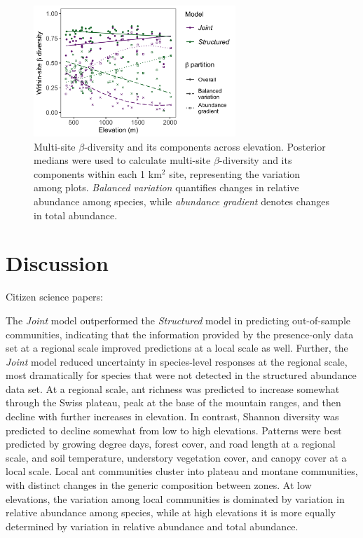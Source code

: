 \documentclass[preprint,review,times,12pt,3p]{elsarticle}
\begin{document}
\begin{figure}
\centering\includegraphics[width=3in]{../../../ms/1_Ecography/1/figs/beta_diversity.png}
\caption{\label{fig:beta_div} Multi-site $\beta$-diversity and its components across elevation. Posterior medians were used to calculate multi-site $\beta$-diversity and its components within each 1 km$^2$ site, representing the variation among plots. \emph{Balanced variation} quantifies changes in relative abundance among species, while \emph{abundance gradient} denotes changes in total abundance.}
\end{figure}


 




\section{Discussion}
\label{S:4}
Citizen science papers: \citep{Altwegg2019, Pernat2020, Henckel2020, Duan2020, Johnston2020,Robinson2020, Beck2010, Poisson2020}

The \emph{Joint} model outperformed the \emph{Structured} model in predicting out-of-sample communities, indicating that the information provided by the presence-only data set at a regional scale improved predictions at a local scale as well. Further, the \emph{Joint} model reduced uncertainty in species-level responses at the regional scale, most dramatically for species that were not detected in the structured abundance data set. At a regional scale, ant richness was predicted to increase somewhat through the Swiss plateau, peak at the base of the mountain ranges, and then decline with further increases in elevation. In contrast, Shannon diversity was predicted to decline somewhat from low to high elevations. Patterns were best predicted by growing degree days, forest cover, and road length at a regional scale, and soil temperature, understory vegetation cover, and canopy cover at a local scale. Local ant communities cluster into plateau and montane communities, with distinct changes in the generic composition between zones. At low elevations, the variation among local communities is dominated by variation in relative abundance among species, while at high elevations it is more equally determined by variation in relative abundance and total abundance.
\end{document}
